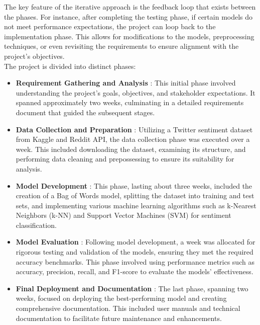 \noindent
The key feature of the iterative approach is the feedback loop that exists between the phases. For instance, after completing the testing phase, if certain models do not meet performance expectations, the project can loop back to the implementation phase. This allows for modifications to the models, preprocessing techniques, or even revisiting the requirements to ensure alignment with the project's objectives. \\

\noindent
The project is divided into distinct phases:

\begin{itemize}
    \item \textbf{Requirement Gathering and Analysis} :
    \noindent
    This initial phase involved understanding the project's goals, objectives, and stakeholder expectations. It spanned approximately two weeks, culminating in a detailed requirements document that guided the subsequent stages.
    \item \textbf{Data Collection and Preparation} :
    \noindent
    Utilizing a Twitter sentiment dataset from Kaggle and Reddit API, the data collection phase was executed over a week. This included downloading the dataset, examining its structure, and performing data cleaning and prepossessing to ensure its suitability for analysis.
    \item \textbf{Model Development} :
    \noindent
    This phase, lasting about three weeks, included the creation of a Bag of Words model, splitting the dataset into training and test sets, and implementing various machine learning algorithms such as k-Nearest Neighbors (k-NN) and Support Vector Machines (SVM) for sentiment classification.
    \item \textbf{Model Evaluation} :
    \noindent
    Following model development, a week was allocated for rigorous testing and validation of the models, ensuring they met the required accuracy benchmarks. This phase involved using performance metrics such as accuracy, precision, recall, and F1-score to evaluate the models' effectiveness.
    \item \textbf{Final Deployment and Documentation} :
    \noindent
    The last phase, spanning two weeks, focused on deploying the best-performing model and creating comprehensive documentation. This included user manuals and technical documentation to facilitate future maintenance and enhancements.
\end{itemize}

